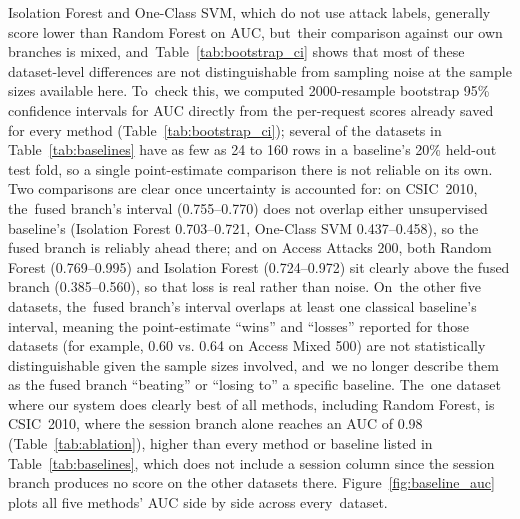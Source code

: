 \documentclass[futureinternet,article,accept,moreauthors]{Definitions/mdpi}
\begin{document}
Isolation Forest and One-Class SVM, which do not use attack labels, generally score lower than Random Forest on AUC, but~their comparison against our own branches is mixed, and~Table~\ref{tab:bootstrap_ci} shows that most of these dataset-level differences are not distinguishable from sampling noise at the sample sizes available here. To~check this, we computed \mbox{2000-resample} bootstrap 95\% confidence intervals for AUC directly from the per-request scores already saved for every method (Table~\ref{tab:bootstrap_ci}); several of the datasets in Table~\ref{tab:baselines} have as few as 24 to 160 rows in a baseline's 20\% held-out test fold, so a single point-estimate comparison there is not reliable on its own. Two comparisons are clear once uncertainty is accounted for: on CSIC~2010, the~fused branch's interval (0.755--0.770) does not overlap either unsupervised baseline's (Isolation Forest 0.703--0.721, One-Class SVM 0.437--0.458), so the fused branch is reliably ahead there; and on Access Attacks 200, both Random Forest (0.769--0.995) and Isolation Forest (0.724--0.972) sit clearly above the fused branch (\mbox{0.385--0.560}), so that loss is real rather than noise. On~the other five datasets, the~fused branch's interval overlaps at least one classical baseline's interval, meaning the point-estimate ``wins'' and ``losses'' reported for those datasets (for example, 0.60 vs. 0.64 on Access Mixed 500) are not statistically distinguishable given the sample sizes involved, and~we no longer describe them as the fused branch ``beating'' or ``losing to'' a specific baseline. The~one dataset where our system does clearly best of all methods, including Random Forest, is CSIC~2010, where the session branch alone reaches an AUC of 0.98 (Table~\ref{tab:ablation}), higher than every method or baseline listed in Table~\ref{tab:baselines}, which does not include a session column since the session branch produces no score on the other datasets there. Figure~\ref{fig:baseline_auc} plots all five methods' AUC side by side across every~dataset.
\end{document}
